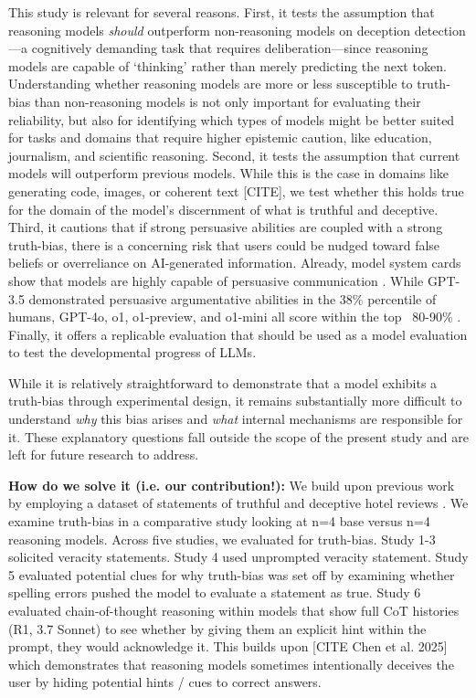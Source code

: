 \documentclass{article}
\begin{document}
This study is relevant for several reasons. First, it tests the assumption that reasoning models \textit{should} outperform non-reasoning models on deception detection---a cognitively demanding task that requires deliberation---since reasoning models are capable of `thinking' rather than merely predicting the next token. Understanding whether reasoning models are more or less susceptible to truth-bias than non-reasoning models is not only important for evaluating their reliability, but also for identifying which types of models might be better suited for tasks and domains that require higher epistemic caution, like education, journalism, and scientific reasoning. Second, it tests the assumption that current models will outperform previous models. While this is the case in domains like generating code, images, or coherent text [CITE], we test whether this holds true for the domain of the model's discernment of what is truthful and deceptive. Third, it cautions that if strong persuasive abilities are coupled with a strong truth-bias, there is a concerning risk that users could be nudged toward false beliefs or overreliance on AI-generated information. Already, model system cards show that models are highly capable of persuasive communication \citep{anthropic_claude_2024, openai_openai_2024}. While GPT-3.5 demonstrated persuasive argumentative abilities in the 38\% percentile of humans, GPT-4o, o1, o1-preview, and o1-mini all score within the top ~80-90\% \citep{openai_openai_2024}. Finally, it offers a replicable evaluation that should be used as a model evaluation to test the developmental progress of LLMs.


While it is relatively straightforward to demonstrate that a model exhibits a truth-bias through experimental design, it remains substantially more difficult to understand \textit{why} this bias arises and \textit{what} internal mechanisms are responsible for it. These explanatory questions fall outside the scope of the present study and are left for future research to address.

\textbf{How do we solve it (i.e. our contribution!):} We build upon previous work by employing a dataset of statements of truthful and deceptive hotel reviews \citep{ott_finding_2011}. We examine truth-bias in a comparative study looking at n=4 base versus n=4 reasoning models. Across five studies, we evaluated for truth-bias. Study 1-3 solicited veracity statements. Study 4 used unprompted veracity statement. Study 5 evaluated potential clues for why truth-bias was set off by examining whether spelling errors pushed the model to evaluate a statement as true. Study 6 evaluated chain-of-thought reasoning within models that show full CoT histories (R1, 3.7 Sonnet) to see whether by giving them an explicit hint within the prompt, they would acknowledge it. This builds upon [CITE Chen et al. 2025] which demonstrates that reasoning models sometimes intentionally deceives the user by hiding potential hints / cues to correct answers. 
\end{document}
